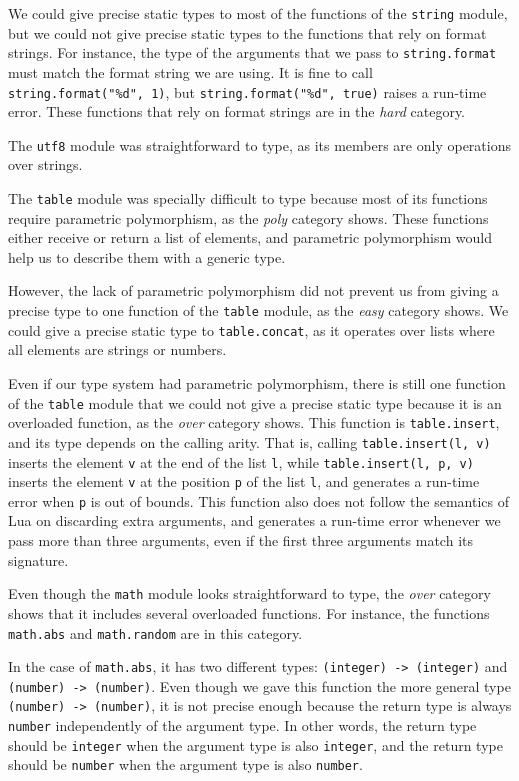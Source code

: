 We could give precise static types to most of the functions of the
\texttt{string} module, but we could not give precise static types
to the functions that rely on format strings.
For instance, the type of the arguments that we pass to
\texttt{string.format} must match the format string we are using.
It is fine to call \texttt{string.format("\%d", 1)}, but
\texttt{string.format("\%d", true)} raises a run-time error.
These functions that rely on format strings are in the \emph{hard} category.

The \texttt{utf8} module was straightforward to type,
as its members are only operations over strings.

The \texttt{table} module was specially difficult to type because
most of its functions require parametric polymorphism,
as the \emph{poly} category shows.
These functions either receive or return a list of elements, and
parametric polymorphism would help us to describe them with a generic type.

However, the lack of parametric polymorphism did not prevent us from
giving a precise type to one function of the \texttt{table} module,
as the \emph{easy} category shows.
We could give a precise static type to \texttt{table.concat},
as it operates over lists where all elements are strings or numbers.

Even if our type system had parametric polymorphism, there is
still one function of the \texttt{table} module that we could
not give a precise static type because it is an overloaded function,
as the \emph{over} category shows.
This function is \texttt{table.insert}, and its type depends on
the calling arity.
That is, calling \texttt{table.insert(l, v)} inserts the
element \texttt{v} at the end of the list \texttt{l},
while \texttt{table.insert(l, p, v)} inserts the element \texttt{v}
at the position \texttt{p} of the list \texttt{l},
and generates a run-time error when \texttt{p} is out of bounds.
This function also does not follow the semantics of Lua on
discarding extra arguments, and generates a run-time error whenever
we pass more than three arguments, even if the first three arguments
match its signature.

Even though the \texttt{math} module looks straightforward to type,
the \emph{over} category shows that it includes several overloaded functions.
For instance, the functions \texttt{math.abs} and \texttt{math.random}
are in this category.

In the case of \texttt{math.abs},
it has two different types: \texttt{(integer) -> (integer)} and
\texttt{(number) -> (number)}.
Even though we gave this function the more general type \texttt{(number) -> (number)},
it is not precise enough because the return type is always \texttt{number}
independently of the argument type.
In other words, the return type should be \texttt{integer} when
the argument type is also \texttt{integer}, and the return type
should be \texttt{number} when the argument type is also \texttt{number}.

